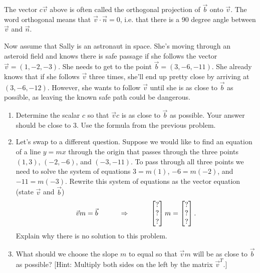 The vector $c\vec v$ above is often called the orthogonal projection of $\vec b$ onto $\vec v$. The word orthogonal means that $\vec v\cdot \vec n=0$, i.e. that there is a 90 degree angle between $\vec v$ and $\vec n$. 


\begin{problem}
 Now assume that Sally is an astronaut in space. She's moving through an asteroid field and knows there is safe passage if she follows the vector $\vec v = (1,-2,-3)$. She needs to get to the point $\vec b=(3,-6,-11)$. She already knows that if she follows $\vec v$ three times, she'll end up pretty close by arriving at $(3,-6,-12)$. However, she wants to follow $\vec v$ until she is as close to $\vec b$ as possible, as leaving the known safe path could be dangerous.  
\begin{enumerate}
 \item 
Determine the scalar $c$ so that $\vec v c$ is as close to $\vec b$ as possible. Your answer should be close to 3.  Use the formula from the previous problem.
  \item 
Let's swap to a different question. 
Suppose we would like to find an equation of a line $y=mx$ through the origin that passes through the three points  $(1,3)$, $(-2,-6)$, and $(-3,-11)$.
To pass through all three points we need to solve the system of equations $3=m(1)$, $-6=m(-2)$, and $-11=m(-3)$. 
Rewrite this system of equations as the vector equation (state $\vec v$ and $\vec b$) 
$$\vec v m = \vec b \quad\quad\quad\Rightarrow\quad\quad\quad \begin{bmatrix} ?\\?\\? \end{bmatrix}m = \begin{bmatrix} ?\\?\\? \end{bmatrix}.$$
Explain why there is no solution to this problem. 
  \item
What should we choose the slope $m$ to equal so that $\vec v m$ will be as close to $\vec b$ as possible? [Hint: Multiply both sides on the left by the matrix $\vec v^T$.]
 \end{enumerate}
\end{problem}


\mysubsection{\ideacon}

